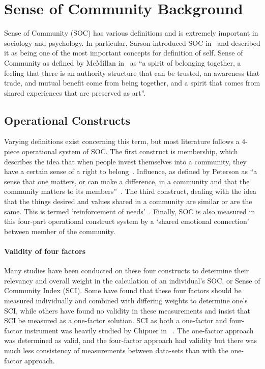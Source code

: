 \documentclass{sig-alternate}
\begin{document}
\section{Sense of Community Background}
\label{sec:background}
Sense of Community (SOC) has various definitions and is extremely important in sociology and psychology. In particular, Sarson introduced SOC in~\cite{sarason:1974} and described it as being one of the most important concepts for definition of self. Sense of Community as defined by McMillan in~\cite{senseOfCommunity:1996} as ``a spirit of belonging together, a feeling that there is an authority structure that can be trusted, an awareness that trade, and mutual benefit come from being together, and a spirit that comes from shared experiences that are preserved as art''. 
\subsection{Operational Constructs}
Varying definitions exist concerning this term, but most literature follows a 4-piece operational system of SOC. The first construct is membership, which describes the idea that when people invest themselves into a community, they have a certain sense of a right to belong~\cite{definition:1986}. Influence, as defined by Peterson as ``a sense that one matters, or can make a difference, in a
community and that the community matters to its members''~\cite{fourFactor:2008}. The third construct, dealing with the idea that the things desired and values shared in a community are similar or are the same. This is termed `reinforcement of needs'~\cite{disparities:2009}. Finally, SOC is also measured in this four-part operational construct system by a `shared emotional connection' between member of the community. 
\paragraph{Validity of four factors}
Many studies have been conducted on these four constructs to determine their relevancy and overall weight in the calculation of an individual's SOC, or Sense of Community Index (SCI). Some have found that these four factors should be measured individually and combined with differing weights to determine one's SCI, while others have found no validity in these measurements and insist that SCI be measured as a one-factor solution. SCI as both a one-factor and four-factor instrument was heavily studied by Chipuer in ~\cite{oneFactor:1999}. The one-factor approach was determined as valid, and the four-factor approach had validity but there was much less consistency of measurements between data-sets than with the one-factor approach.
\end{document}
